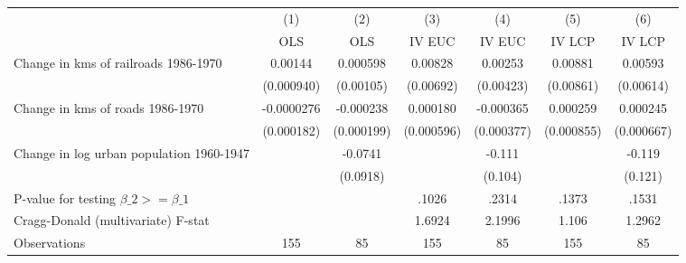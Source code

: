 {
\def\sym#1{\ifmmode^{#1}\else\(^{#1}\)\fi}
\begin{tabular}{l*{6}{c}}
\hline\hline
                &\multicolumn{1}{c}{(1)}&\multicolumn{1}{c}{(2)}&\multicolumn{1}{c}{(3)}&\multicolumn{1}{c}{(4)}&\multicolumn{1}{c}{(5)}&\multicolumn{1}{c}{(6)}\\
                &\multicolumn{1}{c}{OLS}&\multicolumn{1}{c}{OLS}&\multicolumn{1}{c}{IV EUC}&\multicolumn{1}{c}{IV EUC}&\multicolumn{1}{c}{IV LCP}&\multicolumn{1}{c}{IV LCP}\\
\hline
Change in kms of railroads 1986-1970&  0.00144         & 0.000598         &  0.00828         &  0.00253         &  0.00881         &  0.00593         \\
                &(0.000940)         &(0.00105)         &(0.00692)         &(0.00423)         &(0.00861)         &(0.00614)         \\
[1em]
Change in kms of roads 1986-1970&-0.0000276         &-0.000238         & 0.000180         &-0.000365         & 0.000259         & 0.000245         \\
                &(0.000182)         &(0.000199)         &(0.000596)         &(0.000377)         &(0.000855)         &(0.000667)         \\
[1em]
Change in log urban population 1960-1947&                  &  -0.0741         &                  &   -0.111         &                  &   -0.119         \\
                &                  & (0.0918)         &                  &  (0.104)         &                  &  (0.121)         \\
\hline
P-value for testing $\beta\_{2} >= \beta\_{1}$&                  &                  &    .1026         &    .2314         &    .1373         &    .1531         \\
Cragg-Donald (multivariate) F-stat&                  &                  &   1.6924         &   2.1996         &    1.106         &   1.2962         \\
Observations    &      155         &       85         &      155         &       85         &      155         &       85         \\
\hline\hline
\end{tabular}
}
